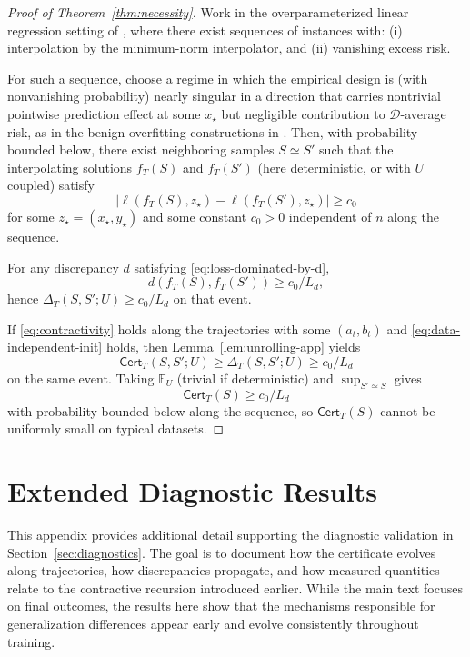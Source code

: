 \documentclass{article}
\numberwithin{equation}{section}
\begin{document}
\begin{proof}[Proof of Theorem~\ref{thm:necessity}]
	Work in the overparameterized linear regression setting of \cite{BartlettLongLugosiTsigler2020}, where there exist sequences of instances with:
	(i) interpolation by the minimum-norm interpolator, and (ii) vanishing excess risk.
	
	For such a sequence, choose a regime in which the empirical design is (with nonvanishing probability) nearly singular in a direction that carries nontrivial pointwise prediction effect at some $x_\star$ but negligible contribution to $\mathcal{D}$-average risk, as in the benign-overfitting constructions in \cite{BartlettLongLugosiTsigler2020}.
	Then, with probability bounded below, there exist neighboring samples $S\simeq S'$ such that the interpolating solutions $f_T(S)$ and $f_T(S')$ (here deterministic, or with $U$ coupled) satisfy
	\[
	\big|\ell(f_T(S),z_\star)-\ell(f_T(S'),z_\star)\big|\ge c_0
	\]
	for some $z_\star=(x_\star,y_\star)$ and some constant $c_0>0$ independent of $n$ along the sequence.
	
	For any discrepancy $d$ satisfying \eqref{eq:loss-dominated-by-d},
	\[
	d(f_T(S),f_T(S')) \ge c_0/L_d,
	\]
	hence $\Delta_T(S,S';U)\ge c_0/L_d$ on that event.
	
	If \eqref{eq:contractivity} holds along the trajectories with some $(a_t,b_t)$ and \eqref{eq:data-independent-init} holds, then Lemma~\ref{lem:unrolling-app} yields
	\[
	\mathsf{Cert}_T(S,S';U)\ge \Delta_T(S,S';U)\ge c_0/L_d
	\]
	on the same event. Taking $\mathbb{E}_U$ (trivial if deterministic) and $\sup_{S'\simeq S}$ gives
	\[
	\mathsf{Cert}_T(S)\ge c_0/L_d
	\]
	with probability bounded below along the sequence, so $\mathsf{Cert}_T(S)$ cannot be uniformly small on typical datasets.
\end{proof}

\section{Extended Diagnostic Results}
\label{app:extended_diagnostics}

This appendix provides additional detail supporting the diagnostic validation in Section~\ref{sec:diagnostics}. The goal is to document how the certificate evolves along trajectories, how discrepancies propagate, and how measured quantities relate to the contractive recursion introduced earlier. While the main text focuses on final outcomes, the results here show that the mechanisms responsible for generalization differences appear early and evolve consistently throughout training.
\end{document}
